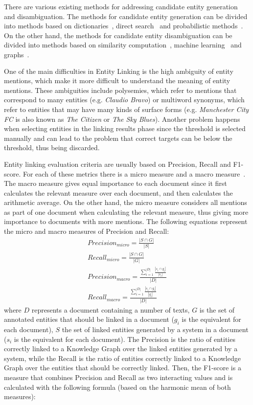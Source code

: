 There are various existing methods for addressing candidate entity generation and 
disambiguation. The methods for candidate entity generation can be divided into methods 
based on dictionaries~\cite{infExtr:ZhangSTW10, infExtr:HanSZ11}, 
direct search~\cite{infExtr:McNameeMLOD11, infExtr:DredzeMRGF10} and 
probabilistic methods~\cite{infExtr:ganea2016, infExtr:PanCHJK15}. On the other hand, the 
methods for candidate entity disambiguation can be divided into methods based on 
similarity computation~\cite{infExtr:Cucerzan07, infExtr:BunescuP06}, 
machine learning~\cite{infExtr:ganea2016, infExtr:ZhangSTW10} 
and graphs~\cite{infExtr:GongFLSH17, infExtr:HanSZ11}.

One of the main difficulties in Entity Linking is the high ambiguity of entity mentions, 
which make it more difficult to understand the meaning of entity mentions. These ambiguities 
include polysemies, which refer to mentions that correspond to many entities (e.g. 
\textit{Claudio Bravo}) or multiword synonyms, which refer to entities that may have many 
kinds of surface forms (e.g. \textit{Manchester City FC} is also known as \textit{The Citizen} 
or \textit{The Sky Blues}). Another problem happens when selecting entities in the linking 
results phase since the threshold is selected manually and can lead to the problem that 
correct targets can be below the threshold, thus being discarded.

Entity linking evaluation criteria are usually based on Precision, Recall and 
F1-score. For each of these metrics there is a micro measure and a macro 
measure~\cite{entlin:CornoltiFC13}. The macro measure gives equal importance to each 
document since it first calculates the relevant measure over each document, and then 
calculates the arithmetic average. On the other hand, the micro measure considers all 
mentions as part of one document when calculating the relevant measure, thus giving more 
importance to documents with more mentions. The following equations represent the micro and 
macro measures of Precision and Recall:
\begin{align*} 
    Precision_{micro} = \frac{|S \cap G|}{|S|} \\
    Recall_{micro} = \frac{|S \cap G|}{|G|} \\
    Precision_{macro} = \frac{\sum_{i=1}^{|D|} \frac{|s_i \cap g_i |}{|s_i|}}{|D|} \\
    Recall_{macro} = \frac{\sum_{i=1}^{|D|} \frac{|s_i \cap g_i |}{|g_i|}}{|D|}
\end{align*}
\noindent where $D$ represents a document containing a number of texts, $G$ is the set of annotated 
entities that should be linked in a document ($g_i$ is the equivalent for each document), 
$S$ the set of linked entities generated by a system in a document ($s_i$ is the equivalent 
for each document). The Precision is the ratio of entities correctly linked to a Knowledge 
Graph over the linked entities generated by a system, while the Recall is the ratio of 
entities correctly linked to a Knowledge Graph over the entities that should be correctly 
linked. Then, the F1-score is a measure that combines Precision and Recall as two 
interacting values and is calculated with the following formula (based on the harmonic 
mean of both measures):

